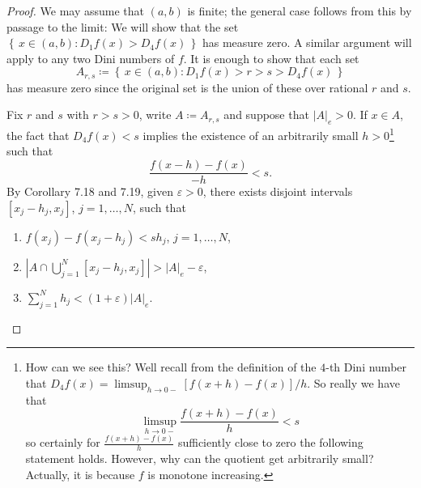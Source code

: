 \begin{proof}
We may assume that $(a,b)$ is finite; the general case follows from this by
passage to the limit: We will show that the set
$\left\{\,x\in(a,b):D_1f(x)>D_4f(x)\,\right\}$ has measure zero. A similar
argument will apply to any two Dini numbers of $f$. It is enough to show
that each set
\[
A_{r,s}\coloneqq\left\{\,x\in(a,b):D_1f(x)>r>s>D_4f(x)\,\right\}
\]
has measure zero since the original set is the union of these over rational
$r$ and $s$.

Fix $r$ and $s$ with $r>s>0$, write $A\coloneqq A_{r,s}$ and suppose that
$|A|_e>0$. If $x\in A$, the fact that $D_4f(x)<s$ implies the existence of
an arbitrarily small $h>0$\footnote{How can we see this? Well recall from
  the definition of the $4$-th Dini number that $D_4f(x)=\limsup_{h\to
    0-}[f(x+h)-f(x)]/h$. So really we have that
\[
\limsup_{h\to 0-}\frac{f(x+h)-f(x)}{h}<s
\]
so certainly for $\frac{f(x+h)-f(x)}{h}$ sufficiently close to zero the
following statement holds. However, why can the quotient get arbitrarily
small? Actually, it is because $f$ is monotone increasing.} such that
\[
\frac{f(x-h)-f(x)}{-h}<s.
\]
By Corollary 7.18 and 7.19, given $\varepsilon>0$, there exists disjoint
intervals $[x_j-h_j,x_j]$, $j=1,\dotsc,N$, such that
\begin{enumerate}[label=(\roman*)]
\item $f(x_j)-f(x_j-h_j)<sh_j$, $j=1,\dotsc,N$,
\item $\left|A\cap\bigcup_{j=1}^N[x_j-h_j,x_j]\right|>|A|_e-\varepsilon$,
\item $\sum_{j=1}^N h_j<(1+\varepsilon)|A|_e$.
\end{enumerate}
\end{proof}


